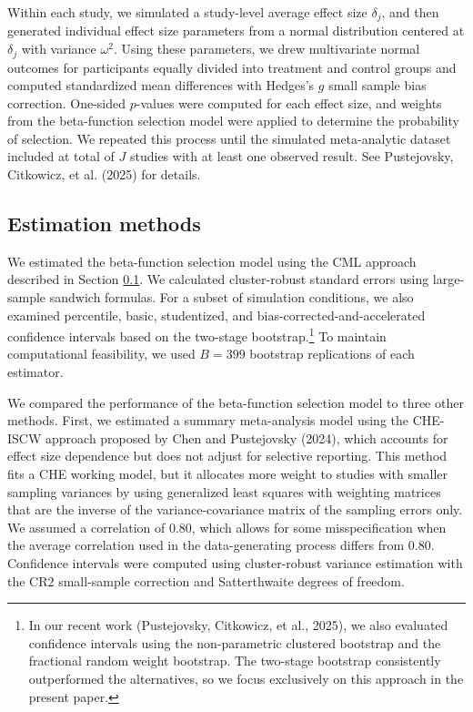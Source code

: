 \documentclass[
  american,
  man, donotrepeattitle,floatsintext]{apa7}
\begin{document}
Within each study, we simulated a study-level average effect size \(\delta_j\), and then generated individual effect size parameters from a normal distribution centered at \(\delta_j\) with variance \(\omega^2\). Using these parameters, we drew multivariate normal outcomes for participants equally divided into treatment and control groups and computed standardized mean differences with Hedges's \(g\) small sample bias correction. One-sided \(p\)-values were computed for each effect size, and weights from the beta-function selection model were applied to determine the probability of selection. We repeated this process until the simulated meta-analytic dataset included at total of \(J\) studies with at least one observed result. See Pustejovsky, Citkowicz, et al. (2025) for details.

\subsection{Estimation methods}\label{estimation-methods}

We estimated the beta-function selection model using the CML approach described in Section \ref{estimation-methods}. We calculated cluster-robust standard errors using large-sample sandwich formulas. For a subset of simulation conditions, we also examined percentile, basic, studentized, and bias-corrected-and-accelerated confidence intervals based on the two-stage bootstrap.\footnote{In our recent work (Pustejovsky, Citkowicz, et al., 2025), we also evaluated confidence intervals using the non-parametric clustered bootstrap and the fractional random weight bootstrap. The two-stage bootstrap consistently outperformed the alternatives, so we focus exclusively on this approach in the present paper.} To maintain computational feasibility, we used \(B = 399\) bootstrap replications of each estimator.

We compared the performance of the beta-function selection model to three other methods. First, we estimated a summary meta-analysis model using the CHE-ISCW approach proposed by Chen and Pustejovsky (2024), which accounts for effect size dependence but does not adjust for selective reporting. This method fits a CHE working model, but it allocates more weight to studies with smaller sampling variances by using generalized least squares with weighting matrices that are the inverse of the variance-covariance matrix of the sampling errors only. We assumed a correlation of 0.80, which allows for some misspecification when the average correlation used in the data-generating process differs from 0.80. Confidence intervals were computed using cluster-robust variance estimation with the CR2 small-sample correction and Satterthwaite degrees of freedom.
\end{document}
